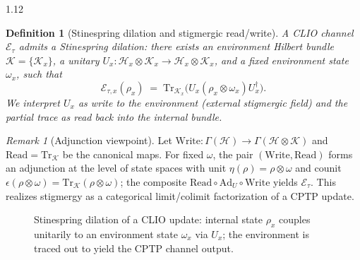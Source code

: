 \documentclass[12pt,a4paper]{article}
\numberwithin{equation}{section}
\newtheorem{definition}{Definition}[section]
\theoremstyle{remark}
\newtheorem{remark}{Remark}[section]
\theoremstyle{definition}
\begin{document}
\begin{spacing}{1.12}
\begin{definition}[Stinespring dilation and stigmergic read/write]
A CLIO channel $\mathcal{E}_\tau$ admits a Stinespring dilation: there exists an environment Hilbert bundle $\mathcal{K}=\{\mathcal{K}_x\}$, a unitary $U_x:\mathcal{H}_x\otimes\mathcal{K}_x\to\mathcal{H}_x\otimes\mathcal{K}_x$, and a fixed environment state $\omega_x$, such that
\begin{equation}
\mathcal{E}_{\tau,x}(\rho_x)\;=\;\mathrm{Tr}_{\mathcal{K}_x}\!\big(U_x(\rho_x\otimes\omega_x)U_x^\dagger\big).
\end{equation}
We interpret $U_x$ as \emph{write} to the environment (external stigmergic field) and the partial trace as \emph{read} back into the internal bundle.
\end{definition}

\begin{remark}[Adjunction viewpoint]
Let $\mathrm{Write}:\Gamma(\mathcal{H})\to\Gamma(\mathcal{H}\otimes\mathcal{K})$ and $\mathrm{Read}=\mathrm{Tr}_{\mathcal{K}}$ be the canonical maps.
For fixed $\omega$, the pair $(\mathrm{Write},\mathrm{Read})$ forms an adjunction at the level of state spaces with unit $\eta(\rho)=\rho\otimes\omega$ and counit $\epsilon(\rho\otimes\omega)=\mathrm{Tr}_{\mathcal{K}}(\rho\otimes\omega)$;
the composite $\mathrm{Read}\circ \mathrm{Ad}_U\circ \mathrm{Write}$ yields $\mathcal{E}_\tau$.
This realizes stigmergy as a categorical limit/colimit factorization of a CPTP update.
\end{remark}

\begin{figure}[t]
\centering
{}
\caption{Stinespring dilation of a CLIO update: internal state $\rho_x$ couples unitarily to an environment state $\omega_x$ via $U_x$; the environment is traced out to yield the CPTP channel output.}
\label{fig:stinespring}
\end{figure}


\end{spacing}
\end{document}
